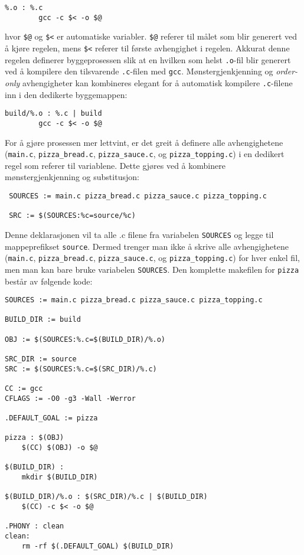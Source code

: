 \begin{lstlisting}
%.o : %.c
        gcc -c $< -o $@
\end{lstlisting}

hvor \verb|$@| og \verb|$<| er automatiske variabler. \verb|$@| referer til målet som blir generert ved å kjøre regelen, mens \verb|$<| referer til første avhengighet i regelen. Akkurat denne regelen definerer byggeprosessen slik at en hvilken som helst \verb|.o|-fil blir generert ved å kompilere den tilsvarende \verb|.c|-filen med \verb|gcc|. Mønstergjenkjenning og \textit{order-only} avhengigheter kan kombineres elegant for å automatisk kompilere \verb|.c|-filene inn i den dedikerte byggemappen:


\begin{lstlisting}
build/%.o : %.c | build
        gcc -c $< -o $@
\end{lstlisting}

For å gjøre prosessen mer lettvint, er det greit å definere alle avhengighetene (\verb|main.c|, \verb|pizza_bread.c|, \verb|pizza_sauce.c|, og \verb|pizza_topping.c|) i en dedikert regel som referer til variablene. Dette gjøres ved å kombinere mønstergjenkjenning og substitusjon:

\begin{lstlisting}
 SOURCES := main.c pizza_bread.c pizza_sauce.c pizza_topping.c
 
 SRC := $(SOURCES:%c=source/%c)
\end{lstlisting}

Denne deklarasjonen vil ta alle .c filene fra variabelen \verb|SOURCES| og legge til mappeprefikset \verb|source|. Dermed trenger man ikke å skrive alle avhengighetene (\verb|main.c|, \verb|pizza_bread.c|, \verb|pizza_sauce.c|, og \verb|pizza_topping.c|) for hver enkel fil, men man kan bare bruke variabelen \verb|SOURCES|. Den komplette makefilen for \verb|pizza| består av følgende kode:


\begin{lstlisting}
SOURCES := main.c pizza_bread.c pizza_sauce.c pizza_topping.c

BUILD_DIR := build

OBJ := $(SOURCES:%.c=$(BUILD_DIR)/%.o)

SRC_DIR := source
SRC := $(SOURCES:%.c=$(SRC_DIR)/%.c)

CC := gcc
CFLAGS := -O0 -g3 -Wall -Werror

.DEFAULT_GOAL := pizza

pizza : $(OBJ)
    $(CC) $(OBJ) -o $@
    
$(BUILD_DIR) :
    mkdir $(BUILD_DIR)

$(BUILD_DIR)/%.o : $(SRC_DIR)/%.c | $(BUILD_DIR)
    $(CC) -c $< -o $@

.PHONY : clean
clean:
    rm -rf $(.DEFAULT_GOAL) $(BUILD_DIR)
\end{lstlisting}


